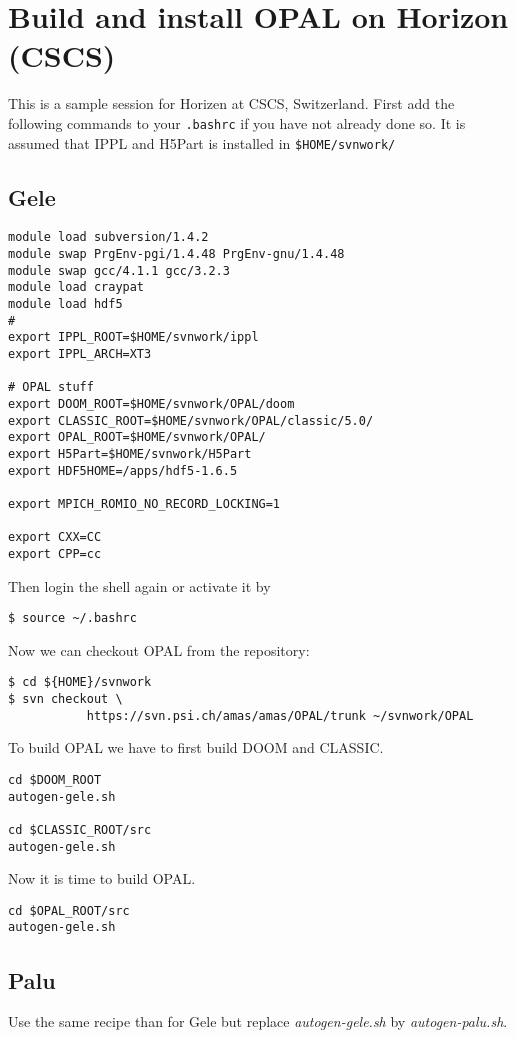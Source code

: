 \section{Build and install OPAL on Horizon (CSCS)}
This is a sample session for  Horizen  at CSCS, Switzerland. First add the following commands to your {\tt .bashrc} if
you have not already done so. It is assumed that IPPL and H5Part is installed in {\tt \${HOME}/svnwork/}

\subsection{Gele}

\begin{verbatim}
module load subversion/1.4.2
module swap PrgEnv-pgi/1.4.48 PrgEnv-gnu/1.4.48
module swap gcc/4.1.1 gcc/3.2.3
module load craypat
module load hdf5
#
export IPPL_ROOT=$HOME/svnwork/ippl
export IPPL_ARCH=XT3

# OPAL stuff
export DOOM_ROOT=$HOME/svnwork/OPAL/doom
export CLASSIC_ROOT=$HOME/svnwork/OPAL/classic/5.0/
export OPAL_ROOT=$HOME/svnwork/OPAL/
export H5Part=$HOME/svnwork/H5Part
export HDF5HOME=/apps/hdf5-1.6.5

export MPICH_ROMIO_NO_RECORD_LOCKING=1

export CXX=CC
export CPP=cc
\end{verbatim}

Then login the shell again or activate it by 
\begin{verbatim}
$ source ~/.bashrc
\end{verbatim}
Now we can checkout OPAL from the repository: 

\begin{verbatim}
$ cd ${HOME}/svnwork
$ svn checkout \
           https://svn.psi.ch/amas/amas/OPAL/trunk ~/svnwork/OPAL
\end{verbatim}
To build OPAL we have to first build DOOM and CLASSIC. 

\begin{verbatim}
cd $DOOM_ROOT
autogen-gele.sh

cd $CLASSIC_ROOT/src
autogen-gele.sh
\end{verbatim}
Now it is time to build OPAL.
\begin{verbatim}
cd $OPAL_ROOT/src
autogen-gele.sh
\end{verbatim}

\subsection{Palu}
Use the same recipe than for Gele but replace  {\em autogen-gele.sh} by {\em autogen-palu.sh}.

